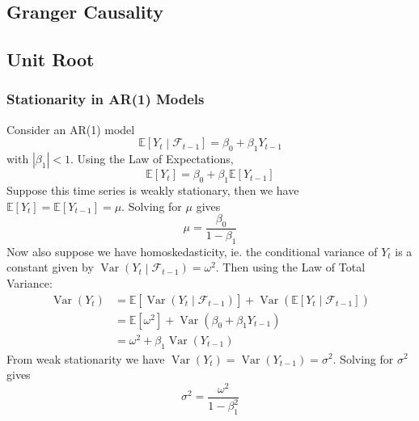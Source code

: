\documentclass[11pt]{report} %
\begin{document}
\subsection{Granger Causality}

\subsection{Unit Root}

\subsubsection{Stationarity in AR(1) Models}

Consider an AR(1) model
\begin{equation}
\mathbb{E}\left[Y_{t} \middle|\mathcal{F}_{t-1}\right] = \beta_{0} + \beta_{1}Y_{t - 1}
\end{equation}
with $\left|\beta_{1}\right| < 1$. Using the Law of Expectations,
\begin{equation}
\mathbb{E}\left[Y_{t}\right] = \beta_{0} + \beta_{1}\mathbb{E}\left[Y_{t - 1}\right]
\end{equation}
Suppose this time series is weakly stationary, then we have $\mathbb{E}\left[Y_{t}\right] = \mathbb{E}\left[Y_{t - 1}\right] = \mu$. Solving for $\mu$ gives
\begin{equation}
\mu = \dfrac{\beta_{0}}{1 - \beta_{1}}
\end{equation}
Now also suppose we have homoskedasticity, ie. the conditional variance of $Y_{t}$ is a constant given by $\operatorname{Var}\left(Y_{t}\middle|\mathcal{F}_{t-1}\right) = \omega^{2}$. Then using the Law of Total Variance:
\begin{align}
\operatorname{Var}\left(Y_{t}\right) &= \mathbb{E}\left[\operatorname{Var}\left(Y_{t}\middle|\mathcal{F}_{t-1}\right)\right] + \operatorname{Var}\left( \mathbb{E}\left[Y_{t}\middle|\mathcal{F}_{t-1}\right]\right) \\
&= \mathbb{E}\left[\omega^{2}\right] + \operatorname{Var}\left(\beta_{0} + \beta_{1}Y_{t - 1}\right) \\
&= \omega^{2} + \beta_{1}\operatorname{Var}\left(Y_{t - 1}\right)
\end{align}
From weak stationarity we have $\operatorname{Var}\left(Y_{t}\right) = \operatorname{Var}\left(Y_{t - 1}\right) = \sigma^{2}$. Solving for $\sigma^{2}$ gives
\begin{equation}
\sigma^{2} = \dfrac{\omega^{2}}{1 - \beta_{1}^{2}}
\end{equation}
\end{document}
